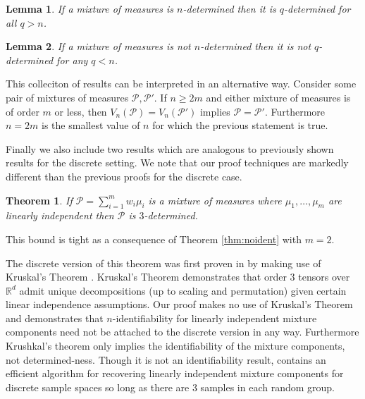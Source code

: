 \documentclass[aos]{imsart}
\def\rn{\mathbb{R}}
\def\sP{\mathscr{P}}
\theoremstyle{plain}
\newtheorem{thm}{Theorem}[section]
\newtheorem{lem}{Lemma}[section]
\theoremstyle{defintion}
\begin{document}
	\begin{lem}\label{lem:det}
		If a mixture of measures is $n$-determined then it is $q$-determined for all $q>n$. 
	\end{lem}
	\begin{lem} \label{lem:nodet}
		If a mixture of measures is not $n$-determined then it is not $q$-determined for any $q<n$. 
	\end{lem}
	This colleciton of results can be interpreted in an alternative way. Consider some pair of mixtures of measures $\sP, \sP'$. If $n\ge2m$ and either mixture of measures is of order $m$ or less, then $V_n\left( \sP \right) = V_n\left( \sP' \right)$ implies $\sP = \sP'$. Furthermore $n=2m$ is the smallest value of $n$ for which the previous statement is true.

	Finally we also include two results which are analogous to previously shown results for the discrete setting. We note that our proof techniques are markedly different than the previous proofs for the discrete case.
	\begin{thm} \label{thm:li}
		If $\sP = \sum_{i=1}^m  w_i\mu_i$ is a mixture of measures where $\mu_1,\ldots,\mu_m$ are linearly independent then $\sP$ is $3$-determined.
	\end{thm}
	This bound is tight as a consequence of Theorem \ref{thm:noident} with $m=2$.

	The discrete version of this theorem was first proven in \cite{allman09} by making use of Kruskal's Theorem \cite{kruskal77}. Kruskal's Theorem demonstrates that order 3 tensors over $\rn^d$ admit unique decompositions (up to scaling and permutation) given certain linear independence assumptions. Our proof makes no use of Kruskal's Theorem and demonstrates that $n$-identifiability for linearly independent mixture components need not be attached to the discrete version in any way. Furthermore Krushkal's theorem only implies the identifiability of the mixture components, not determined-ness. Though it is not an identifiability result, \cite{anandkumar14} contains an efficient algorithm for recovering linearly independent mixture components for discrete sample spaces so long as there are 3 samples in each random group.
\end{document}
